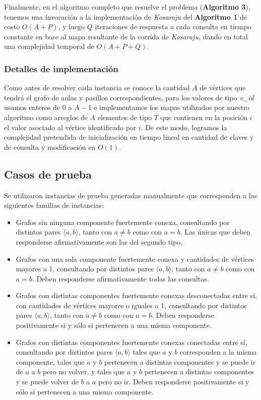 Finalmente, en el algoritmo completo que resuelve el problema (\textbf{Algoritmo 3}), tenemos una invocación a la implementación de \textit{Kosaraju} del \textbf{Algoritmo 1} de costo $O(A+P)$, y luego $Q$ iteraciones de respuesta a cada consulta en tiempo constante en base al mapa resultante de la corrida de \textit{Kosaraju}, dando en total una complejidad temporal de $O(A+P+Q)$.

\subsubsection{Detalles de implementación}

Como antes de resolver cada instancia se conoce la cantidad $A$ de vértices que tendrá el grafo de aulas y pasillos correspondientes, para los valores de tipo \textit{v\_id} usamos enteros de $0$ a $A-1$ e implementamos los mapas utilizados por nuestro algoritmo como arreglos de $A$ elementos de tipo $T$ que contienen en la posición $i$ el valor asociado al vértice identificado por $i$. De este modo, logramos la complejidad pretendida de inicialización en tiempo lineal en cantidad de claves y de consulta y modificación en $O(1)$.

\subsection{Casos de prueba}

Se utilizaron instancias de prueba generadas manualmente que corresponden a las siguientes familias de instancias:

\begin{itemize}
    \item Grafos sin ninguna componente fuertemente conexa, consultando por distintos pares $\langle a, b \rangle$, tanto con $a \neq b$ como con $a = b$. Las únicas que deben responderse afirmativamente son las del segundo tipo.
    \item Grafos con una sola componente fuertemente conexa y cantidades de vértices mayores a 1, consultando por distintos pares $\langle a, b \rangle$, tanto con $a \neq b$ como con $a = b$. Deben responderse afirmativamente todas las consultas.
    \item Grafos con distintas componentes fuertemente conexas desconectadas entre sí, con cantidades de vértices mayores o iguales a 1, consultando por distintos pares $\langle a, b \rangle$, tanto con $a \neq b$ como con $a = b$. Deben responderse positivamente si y sólo si pertenecen a una misma componente.
    \item Grafos con distintas componentes fuertemente conexas conectadas entre sí, consultando por distintos pares $\langle a, b \rangle$ tales que $a$ y $b$ corresponden a la misma componente, tales que $a$ y $b$ pertenecen a distintas componentes y se puede ir de $a$ a $b$ pero no volver, y tales que $a$ y $b$ pertenecen a distintas componentes y se puede volver de $b$ a $a$ pero no ir. Deben responderse positivamente si y sólo si pertenecen a una misma componente.
\end{itemize}

